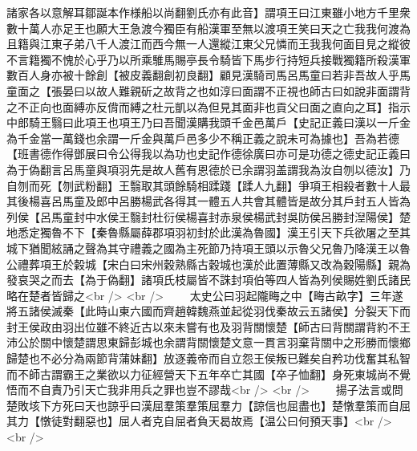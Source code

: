 諸家各以意解耳鄒誕本作様船以尚翻劉氏亦有此音】謂項王曰江東雖小地方千里衆數十萬人亦足王也願大王急渡今獨臣有船漢軍至無以渡項王笑曰天之亡我我何渡為且籍與江東子弟八千人渡江而西今無一人還縱江東父兄憐而王我我何面目見之縱彼不言籍獨不愧於心乎乃以所乘騅馬賜亭長令騎皆下馬步行持短兵接戰獨籍所殺漢軍數百人身亦被十餘創【被皮義翻創初良翻】顧見漢騎司馬呂馬童曰若非吾故人乎馬童面之【張晏曰以故人難親斫之故背之也如淳曰面謂不正視也師古曰如說非面謂背之不正向也面縛亦反偝而縛之杜元凱以為但見其面非也貢父曰面之直向之耳】指示中郎騎王翳曰此項王也項王乃曰吾聞漢購我頭千金邑萬戶【史記正義曰漢以一斤金為千金當一萬錢也余謂一斤金與萬戶邑多少不稱正義之說未可為據也】吾為若德【班書德作得鄧展曰令公得我以為功也史記作德徐廣曰亦可是功德之德史記正義曰為于偽翻言呂馬童與項羽先是故人舊有恩德於已余謂羽盖謂我為汝自刎以德汝】乃自刎而死【刎武粉翻】王翳取其頭餘騎相蹂踐【蹂人九翻】爭項王相殺者數十人最其後楊喜呂馬童及郎中呂勝楊武各得其一體五人共會其體皆是故分其戶封五人皆為列侯【呂馬童封中水侯王翳封杜衍侯楊喜封赤泉侯楊武封吳防侯呂勝封湼陽侯】楚地悉定獨魯不下【秦魯縣屬薛郡項羽初封於此漢為魯國】漢王引天下兵欲屠之至其城下猶聞絃誦之聲為其守禮義之國為主死節乃持項王頭以示魯父兄魯乃降漢王以魯公禮葬項王於糓城【宋白曰宋州穀熟縣古穀城也漢於此置薄縣又改為穀陽縣】親為發哀哭之而去【為于偽翻】諸項氏枝屬皆不誅封項伯等四人皆為列侯賜姓劉氏諸民略在楚者皆歸之<br />
<br />
　　太史公曰羽起隴畮之中【畮古畝字】三年遂將五諸侯滅秦【此時山東六國而齊趙韓魏燕並起從羽伐秦故云五諸侯】分裂天下而封王侯政由羽出位雖不終近古以來未嘗有也及羽背關懷楚【師古曰背關謂背約不王沛公於關中懷楚謂思東歸彭城也余謂背關懷楚文意一貫言羽棄背關中之形勝而懷鄉歸楚也不必分為兩節背蒲妹翻】放逐義帝而自立怨王侯叛已難矣自矜功伐奮其私智而不師古謂霸王之業欲以力征經營天下五年卒亡其國【卒子恤翻】身死東城尚不覺悟而不自責乃引天亡我非用兵之罪也豈不謬哉<br />
<br />
　　揚子法言或問楚敗垓下方死曰天也諒乎曰漢屈羣策羣策屈羣力【諒信也屈盡也】楚憞羣策而自屈其力【憞徒對翻惡也】屈人者克自屈者負天曷故焉【温公曰何預天事】<br />
<br />
